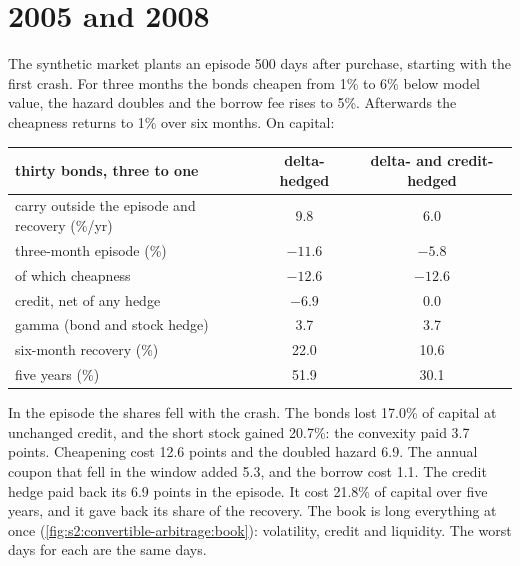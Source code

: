\section{2005 and 2008}

The synthetic market plants an episode 500 days after purchase, starting with the first crash. For three months the bonds cheapen from 1\% to 6\%
below model value, the hazard doubles and the borrow fee rises to 5\%. Afterwards the cheapness returns to 1\% over six months. On capital:

\begin{center}
\small
\begin{tabular}{@{}lcc@{}}
\toprule
thirty bonds, three to one & delta-hedged & delta- and credit-hedged\\
\midrule
carry outside the episode and recovery (\%/yr) & 9.8 & 6.0\\
three-month episode (\%) & $-11.6$ & $-5.8$\\
\quad of which cheapness & $-12.6$ & $-12.6$\\
\quad credit, net of any hedge & $-6.9$ & 0.0\\
\quad gamma (bond and stock hedge) & 3.7 & 3.7\\
six-month recovery (\%) & 22.0 & 10.6\\
five years (\%) & 51.9 & 30.1\\
\bottomrule
\end{tabular}
\end{center}

In the episode the shares fell with the crash. The bonds lost 17.0\% of capital at unchanged credit, and the short stock gained 20.7\%: the
convexity paid 3.7 points. Cheapening cost 12.6 points and the doubled hazard 6.9. The annual coupon that fell in the window added 5.3, and the
borrow cost 1.1. The credit hedge paid back its 6.9 points in the episode. It cost 21.8\% of capital over five years, and it gave back its share of
the recovery. The book is long everything at once (\cref{fig:s2:convertible-arbitrage:book}): volatility, credit and liquidity. The worst days for each
are the same days.

